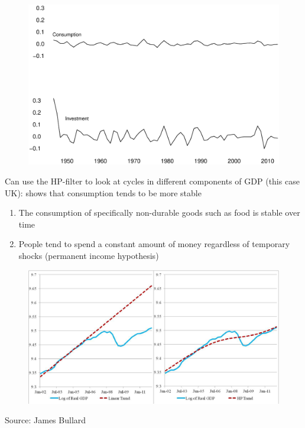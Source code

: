 \documentclass{beamer}
\begin{document}
\begin{frame}
  \begin{figure}
    \includegraphics[scale=.3]{uk_ci.eps}
  \end{figure}
\end{frame}

\begin{frame}
  Can use the HP-filter to look at cycles in different components of GDP (this case UK): shows that consumption tends to be more stable
  \begin{enumerate}
    \item The consumption of specifically non-durable goods such as food is stable over time
    \item People tend to spend a constant amount of money regardless of temporary shocks (permanent income hypothesis)
  \end{enumerate}
\end{frame}

\begin{frame}
  \begin{figure}
    \includegraphics[scale=.3]{us_potential.eps}
  \end{figure}
  Source: James Bullard
\end{frame}
\end{document}
